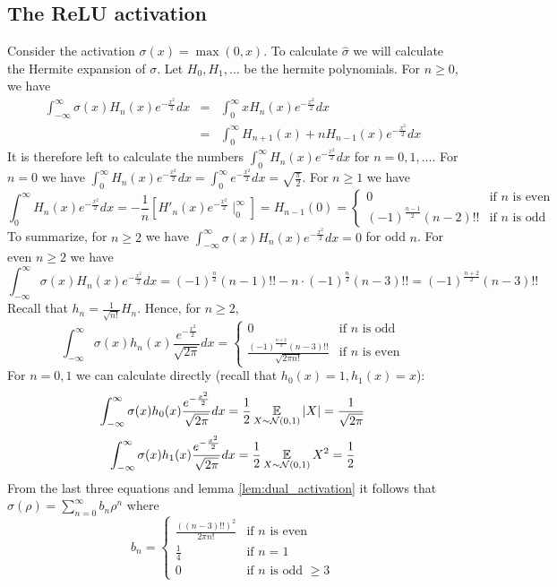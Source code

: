 \subsection{The ReLU activation}
Consider the activation $\sigma(x)=\max(0,x)$. To calculate $\hat\sigma$ we will calculate the Hermite expansion of $\sigma$. Let $H_0,H_1,\ldots$ be the hermite polynomials. For $n\ge 0$, we have
\begin{eqnarray*}
\int_{-\infty}^\infty \sigma(x)H_n(x)e^{-\frac{x^2}{2}}dx &=& \int_{0}^\infty xH_n(x)e^{-\frac{x^2}{2}}dx
\\
&=& \int_{0}^\infty H_{n+1}(x) + nH_{n-1}(x)e^{-\frac{x^2}{2}}dx
\end{eqnarray*}
It is therefore left to calculate the numbers $\int_{0}^\infty H_{n}(x)e^{-\frac{x^2}{2}}dx$ for $n=0,1,\ldots$. For $n=0$ we have $\int_{0}^\infty H_{n}(x)e^{-\frac{x^2}{2}}dx = \int_{0}^\infty e^{-\frac{x^2}{2}}dx = \sqrt{\frac{\pi}{2}}$. For $n\ge 1$ we have
\[
\int_{0}^\infty H_{n}(x)e^{-\frac{x^2}{2}}dx = -\frac{1}{n}\left[ H'_{n}(x)e^{-\frac{x^2}{2}}\mid^\infty_0\right] = H_{n-1}(0) = \begin{cases}0 &\text{if }n\text{ is even}\\
(-1)^{\frac{n-1}{2}}(n-2)!!&\text{if }n\text{ is odd}\end{cases}
\]
To summarize, for $n\ge 2$ we have $\int_{-\infty}^\infty \sigma(x)H_n(x)e^{-\frac{x^2}{2}}dx = 0$ for odd $n$. For even $n\ge 2$ we have
\[
\int_{-\infty}^\infty \sigma(x)H_n(x)e^{-\frac{x^2}{2}}dx = (-1)^{\frac{n}{2}}(n-1)!! - n\cdot (-1)^{\frac{n}{2}}(n-3)!! =  (-1)^{\frac{n+2}{2}}(n-3)!!
\]
Recall that $h_n=\frac{1}{\sqrt{n!}} H_n$. Hence, for $n\ge 2$,
\[
\int_{-\infty}^\infty \sigma(x)h_n(x)\frac{e^{-\frac{x^2}{2}}}{\sqrt{2\pi}}dx = \begin{cases} 0 & \text{if }n\text{ is odd}\\
\frac{(-1)^{\frac{n+2}{2}}(n-3)!!}{\sqrt{2\pi n!}} & \text{if }n\text{ is even}\end{cases}
\]
For $n=0,1$ we can calculate directly (recall that $h_0(x)=1, h_1(x)=x$):
\[
\int_{-\infty}^\infty \sigma(x)h_0(x)\frac{e^{-\frac{x^2}{2}}}{\sqrt{2\pi}}dx = \frac{1}{2}\operatorname*{\mathbb{E}}_{X\sim{\cal N}(0,1)}|X| = \frac{1}{\sqrt{2\pi}}
\]
\[
\int_{-\infty}^\infty \sigma(x)h_1(x)\frac{e^{-\frac{x^2}{2}}}{\sqrt{2\pi}}dx = \frac{1}{2}\operatorname*{\mathbb{E}}_{X\sim{\cal N}(0,1)}X^2 = \frac{1}{2}
\]
From the last three equations and lemma \ref{lem:dual_activation} it follows that $\hat\sigma(\rho)=\sum_{n=0}^\infty b_n\rho^n$ where
\[
b_n=\begin{cases}
\frac{((n-3)!!)^2}{2\pi n!} & \text{if }n\text{ is even}
\\
\frac{1}{4} & \text{if }n = 1
\\
0 & \text{if }n\text{ is odd }\ge 3
\end{cases}
\]




